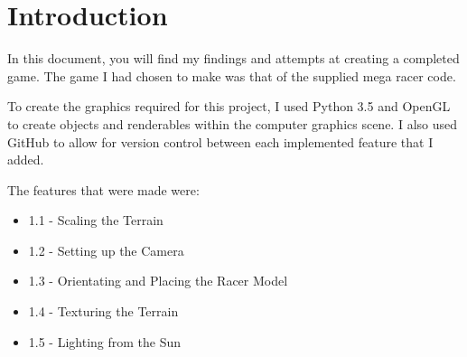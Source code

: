 \documentclass[11pt, oneside, a4paper]{article}
\begin{document}


\pagestyle{fancy}
\fancyhf{}


\newpage
\tableofcontents

\listoffigures

\newpage


\section{Introduction}
In this document, you will find my findings and attempts at creating a completed game. The game I had chosen to make was that of the supplied mega racer code.

To create the graphics required for this project, I used Python 3.5 and OpenGL to create objects and renderables within the computer graphics scene. I also used GitHub to allow for version control between each implemented feature that I added.

The features that were made were:
\begin{itemize}
	\item{1.1 - Scaling the Terrain}
	\item{1.2 - Setting up the Camera}
	\item{1.3 - Orientating and Placing the Racer Model}
	\item{1.4 - Texturing the Terrain}
	\item{1.5 - Lighting from the Sun}
\end{itemize}
\end{document}
